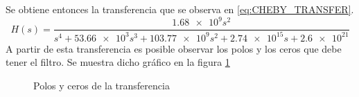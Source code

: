 Se obtiene entonces la transferencia que se observa en \ref{eq:CHEBY_TRANSFER}.
\begin{equation}
    H(s) = \frac{\num{1.68e9}s^2}{s^4 + \num{53.66e3}s^3 + \num{103.77e9}s^2+\num{2.74e15}s+\num{2.6e+21}}
    \label{eq:CHEBY_TRANSFER}
\end{equation}
A partir de esta transferencia es posible observar los polos y los ceros que debe tener el filtro. Se muestra dicho gr\'afico en la figura \ref{fig:CHEBY_POLES}
\begin{figure}[H]
    \centering
    \caption{Polos y ceros de la transferencia}
    \label{fig:CHEBY_POLES}
\end{figure}

